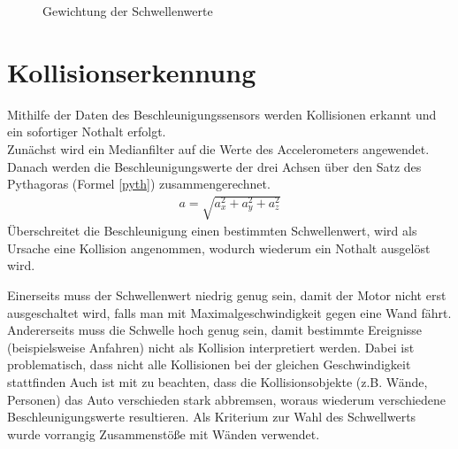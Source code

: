 \documentclass[a4paper,12pt]{report}
\begin{document}
	\begin{figure}[ht]
		\centering
		
		\caption{Gewichtung der Schwellenwerte}
		\label{img-uss-function-parabola}
	\end{figure}

\chapter{Kollisionserkennung}


	Mithilfe der Daten des Beschleunigungssensors werden Kollisionen erkannt und ein sofortiger Nothalt erfolgt.\\
Zunächst wird ein Medianfilter auf die Werte des Accelerometers angewendet. Danach werden die Beschleunigungswerte der drei Achsen über den Satz des Pythagoras (Formel \ref{pyth}) zusammengerechnet.
\begin{align}
	a = \sqrt{a_{x}^2+a_{y}^2+a_{z}^2}
	\label{pyth}
\end{align}
Überschreitet die Beschleunigung einen bestimmten Schwellenwert, wird als Ursache eine Kollision angenommen, wodurch wiederum ein Nothalt ausgelöst wird.

Einerseits muss der Schwellenwert niedrig genug sein, damit der Motor nicht erst ausgeschaltet wird, falls man mit Maximalgeschwindigkeit gegen eine Wand fährt.
Andererseits muss die Schwelle hoch genug sein, damit bestimmte Ereignisse (beispielsweise Anfahren) nicht als Kollision interpretiert werden.
Dabei ist problematisch, dass nicht alle Kollisionen bei der gleichen Geschwindigkeit stattfinden
Auch ist mit zu beachten, dass die Kollisionsobjekte (z.B. Wände, Personen) das Auto verschieden stark abbremsen, woraus wiederum verschiedene Beschleunigungswerte resultieren.
Als Kriterium zur Wahl des Schwellwerts wurde vorrangig Zusammenstöße mit Wänden verwendet.
\end{document}
